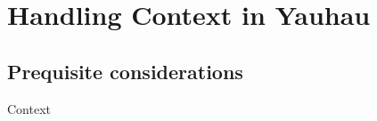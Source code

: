 
\chapter{Handling Context in Yauhau} %

\label{ChapterRewrites} %


\section{Prequisite considerations} %

Context 
